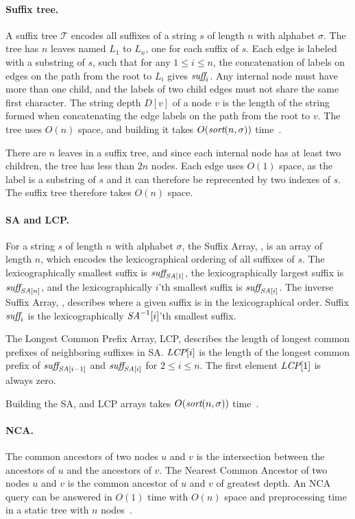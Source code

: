 \documentclass[a4]{article}
\begin{document}
\paragraph{Suffix tree.} A suffix tree $\mathcal{T}$ encodes all suffixes of a string $s$ of length $n$ with alphabet $\sigma$. The tree has $n$ leaves named $L_1$ to $L_n$, one for each suffix of $s$. Each edge is labeled with a substring of $s$, such that for any $1\leq i\leq n$, the concatenation of labels on edges on the path from the root to $L_i$ gives $\textit{suff}_i$. Any internal node must have more than one child, and the labels of two child edges must not share the same first character. The string depth $D[v]$ of a node $v$ is the length of the string formed when concatenating the edge labels on the path from the root to $v$.
The tree uses $O(n)$ space, and building it takes $O(\textit{sort}(n,\sigma))$ time~\cite{sort-complexity}.

\ifreport

There are $n$ leaves in a suffix tree, and since each internal node has at least two children, the tree has less than $2n$ nodes. Each edge uses $O(1)$ space, as the label is a substring of $s$ and it can therefore be reprecented by two indexes of $s$. The suffix tree therefore takes $O(n)$ space.

\fi %

\paragraph{SA and LCP.} For a string $s$ of length $n$ with alphabet $\sigma$, the Suffix Array, \SA, is an array of length $n$, which encodes the lexicographical ordering of all suffixes of $s$. The lexicographically smallest suffix is $\textit{suff}_{\textit{SA}[1]}$, the lexicographically largest suffix is $\textit{suff}_{\textit{SA}[n]}$, and the lexicographically $i$'th smallest suffix is $\textit{suff}_{\textit{SA}[i]}$. The inverse Suffix Array, \SAi, describes where a given suffix is in the lexicographical order. Suffix $\textit{suff}_i$ is the lexicographically $\textit{SA}^{-1}[i]$'th smallest suffix.

The Longest Common Prefix Array, LCP, describes the length of longest common prefixes of neighboring suffixes in SA. $\textit{LCP}[i]$ is the length of the longest common prefix of $\textit{suff}_{\textit{SA}[i-1]}$ and $\textit{suff}_{\textit{SA}[i]}$ for $2 \leq i \leq n$. The first element $\textit{LCP}[1]$ is always zero.

Building the SA, \SAi and LCP arrays takes $O(\textit{sort}(n,\sigma))$ time~\cite{sort-complexity}.

\paragraph{NCA.} The common ancestors of two nodes $u$ and $v$ is the intersection between the ancestors of $u$ and the ancestors of $v$. The Nearest Common Ancestor of two nodes $u$ and $v$ is the common ancestor of $u$ and $v$ of greatest depth. An NCA query can be answered in $O(1)$ time with $O(n)$ space and preprocessing time in a static tree with $n$ nodes~\cite{nca}.
\end{document}

